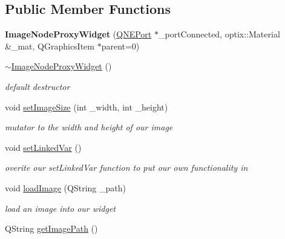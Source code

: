 \subsection*{Public Member Functions}
\begin{DoxyCompactItemize}
\item 
\hypertarget{class_image_node_proxy_widget_aa978f88ffefe88664d6d4f5177224015}{{\bfseries Image\-Node\-Proxy\-Widget} (\hyperlink{class_q_n_e_port}{Q\-N\-E\-Port} $\ast$\-\_\-port\-Connected, optix\-::\-Material \&\-\_\-mat, Q\-Graphics\-Item $\ast$parent=0)}\label{class_image_node_proxy_widget_aa978f88ffefe88664d6d4f5177224015}

\item 
\hypertarget{class_image_node_proxy_widget_acbe422d61639eb6479ae01e2f4c6531a}{\hyperlink{class_image_node_proxy_widget_acbe422d61639eb6479ae01e2f4c6531a}{$\sim$\-Image\-Node\-Proxy\-Widget} ()}\label{class_image_node_proxy_widget_acbe422d61639eb6479ae01e2f4c6531a}

\begin{DoxyCompactList}\small\item\em default destructor \end{DoxyCompactList}\item 
\hypertarget{class_image_node_proxy_widget_af837a3a6278f17d6be03f309302d1614}{void \hyperlink{class_image_node_proxy_widget_af837a3a6278f17d6be03f309302d1614}{set\-Image\-Size} (int \-\_\-width, int \-\_\-height)}\label{class_image_node_proxy_widget_af837a3a6278f17d6be03f309302d1614}

\begin{DoxyCompactList}\small\item\em mutator to the width and height of our image \end{DoxyCompactList}\item 
\hypertarget{class_image_node_proxy_widget_a18574265844e2a6165ab6608f08a5fe1}{void \hyperlink{class_image_node_proxy_widget_a18574265844e2a6165ab6608f08a5fe1}{set\-Linked\-Var} ()}\label{class_image_node_proxy_widget_a18574265844e2a6165ab6608f08a5fe1}

\begin{DoxyCompactList}\small\item\em overite our set\-Linked\-Var function to put our own functionality in \end{DoxyCompactList}\item 
void \hyperlink{class_image_node_proxy_widget_a0930cf7ae23b7056c46f8ecd510f1542}{load\-Image} (Q\-String \-\_\-path)
\begin{DoxyCompactList}\small\item\em load an image into our widget \end{DoxyCompactList}\item 
\hypertarget{class_image_node_proxy_widget_a6e21c3e4552dc8a7da308a905c9b841d}{Q\-String \hyperlink{class_image_node_proxy_widget_a6e21c3e4552dc8a7da308a905c9b841d}{get\-Image\-Path} ()}\label{class_image_node_proxy_widget_a6e21c3e4552dc8a7da308a905c9b841d}


\end{DoxyCompactItemize}
